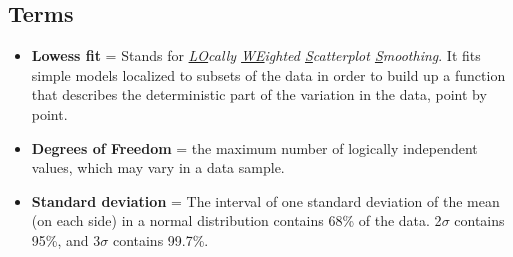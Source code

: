 \subsection{Terms}

\begin{itemize}
    \item \textbf{Lowess fit} = Stands for \textit{\underline{LO}cally \underline{WE}ighted \underline{S}catterplot \underline{S}moothing}.
    It fits simple models localized to subsets of the data in order to build up a function that describes the deterministic part of the variation in the data, point by point.
    \item \textbf{Degrees of Freedom} = the maximum number of logically independent values, which may vary in a data sample. 
    \item \textbf{Standard deviation} = The interval of one standard deviation of the mean (on each side) in a normal distribution contains 68\% of the data. 2$\sigma$ contains 95\%, and 3$\sigma$ contains 99.7\%.
\end{itemize} 
